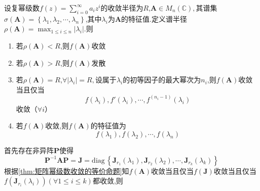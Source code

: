 \begin{formal}
    \begin{theorem}[审敛法]\label{thm:审敛法}
        设复幂级数$\displaystyle f\left(z\right)=\sum_{i=0}^{\infty}a_iz^i$的收敛半径为$R$,$\bm{A}\in M_n\left(\mathbb{C}\right),$其谱集$\sigma\left(\bm{A}\right)=\left\{
            \lambda_1,\lambda_2,\cdots,\lambda_n
            \right\}$,其中$\lambda_i$为$\bm{A}$的特征值.定义谱半径$\displaystyle \rho\left(\bm{A}\right)=\max_{
                1\leqslant i\leqslant n
            }\left|\lambda_i\right|$.则
            \begin{enumerate}[label={\textup{(\arabic*)}}]
                \item 若$\rho\left(\bm{A}\right)<R$,则$f\left(\bm{A}\right)$收敛
                \item 若$\rho\left(\bm{A}\right)>R$,则$f\left(\bm{A}\right)$发散
                \item 若$\rho\left(\bm{A}\right)=R$,$\forall\left|\lambda_i\right|=R,$设属于$\lambda_i$的初等因子的最大幂次为$n_i$,则$f\left(\bm{A}\right)$收敛当且仅当\[
                f\left(\lambda_i\right),
                f'\left(\lambda_i\right),
                \cdots,
                f^{\left(n_i-1\right)}\left(\lambda_i\right)
                \]收敛（$\forall i$）
                \item 若$f\left(\bm{A}\right)$收敛,则$f\left(\bm{A}\right)$的特征值为\[
                f\left(\lambda_1\right),f\left(\lambda_2\right),\cdots,f\left(\lambda_n\right)
                \]
            \end{enumerate}
    \end{theorem}
    \begin{Proof}
        首先存在非异阵$\bm{P}$使得\[
        \bm{P}^{-1}\bm{A}\bm{P}=\bm{J}=\mathrm{diag}\,\left\{
            \bm{J}_{r_1}\left(\lambda_1\right),\bm{J}_{r_2}\left(\lambda_2\right),\cdots,\bm{J}_{r_k}\left(\lambda_k\right)
        \right\}
        \]根据\cref{thm:矩阵幂级数收敛的等价命题}知$f\left(\bm{A}\right)$收敛当且仅当$f\left(\bm{J}\right)$收敛当且仅当$f\left(
            \bm{J}_{r_i}\left(\lambda_i\right)
        \right)\left(
            \forall 1\leqslant i\leqslant k
        \right)$都收敛,则
\end{Proof}
\end{formal}
